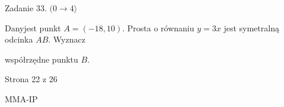\documentclass[a4paper,12pt]{article}
\begin{document}
Zadanie 33. $(0\rightarrow 4\rangle$

Danyjest punkt $A=(-18,10)$. Prosta o równaniu $y=3x$ jest symetralną odcinka $AB$. Wyznacz

współrzędne punktu $B.$

Strona 22 z 26

MMA-IP
\end{document}
